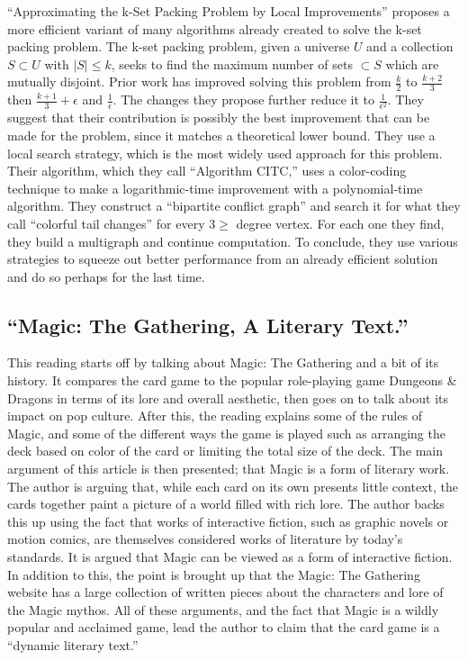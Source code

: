 \documentclass[12pt, letterpaper]{article}
\begin{document}
\enquote{Approximating the k-Set Packing Problem by Local Improvements}
proposes a more efficient variant of many algorithms already created to solve the k-set packing problem.
The k-set packing problem, given a universe $ U $ and a collection $ S \subset U $ with $ |S| \le k $,
seeks to find the maximum number of sets $ \subset S $ which are mutually disjoint.
Prior work has improved solving this problem from $ \frac{k}{2} $ to $ \frac{k + 2}{3} $
then $ \frac{k + 1}{3} + \epsilon $ and $ \frac{1}{\epsilon} $.
The changes they propose further reduce it to $ \frac{1}{\epsilon^2} $.
They suggest that their contribution is possibly the best improvement that can be made for the problem,
since it matches a theoretical lower bound.
They use a local search strategy,
which is the most widely used approach for this problem.
Their algorithm, which they call \enquote{Algorithm CITC,}
uses a color-coding technique to make a logarithmic-time improvement with a polynomial-time algorithm.
They construct a \enquote{bipartite conflict graph}
and search it for what they call \enquote{colorful tail changes} for every $ 3 \ge $ degree vertex.
For each one they find,
they build a multigraph and continue computation.
To conclude, they use various strategies to squeeze out better performance from an already efficient solution
and do so perhaps for the last time.

\subsection{\enquote{Magic: The Gathering, A Literary Text.}}
\label{sec:3.7}

This reading starts off by talking about Magic: The Gathering and a bit of its history.
It compares the card game to the popular role-playing game
Dungeons \& Dragons in terms of its lore and overall aesthetic,
then goes on to talk about its impact on pop culture.
After this, the reading explains some of the rules of Magic,
and some of the different ways the game is played such as arranging the deck based on color of the card or
limiting the total size of the deck.
The main argument of this article is then presented;
that Magic is a form of literary work.
The author is arguing that,
while each card on its own presents little context,
the cards together paint a picture of a world filled with rich lore.
The author backs this up using the fact that works of interactive fiction,
such as graphic novels or motion comics,
are themselves considered works of literature by today's standards.
It is argued that Magic can be viewed as a form of interactive fiction.
In addition to this, the point is brought up that the Magic: The Gathering website
has a large collection of written pieces about the characters and lore of the Magic mythos.
All of these arguments, and the fact that Magic is a wildly popular and acclaimed game,
lead the author to claim that the card game is a \enquote{dynamic literary text.}
\end{document}
